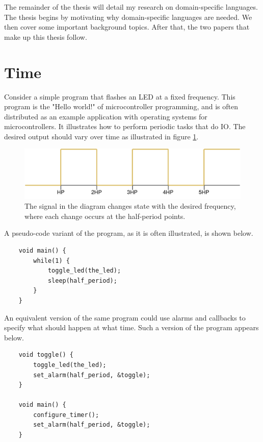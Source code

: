 
The remainder of the thesis will detail my research on domain-specific languages. The thesis begins by motivating
why domain-specific languages are needed. We then cover some important background topics. After that, the
two papers that make up this thesis follow.

\section{Time}

Consider a simple program
that flashes an LED at a fixed frequency. This program is the "Hello world!" of microcontroller programming, and is often distributed
as an example application with operating systems for microcontrollers. It illustrates how to perform
periodic tasks that do IO. The desired output should vary over time as illustrated in figure \ref{graphics:correct-frequency}.

\begin{figure}
    \centering
    \includegraphics[scale=0.2]{graphics/correct-frequency.png}
    \caption{The signal in the diagram changes state with the desired frequency, where each change occurs at the half-period points.}
    \label{graphics:correct-frequency}
\end{figure}

A pseudo-code variant of the program, as it is often illustrated, is shown below.

\begin{verbatim}
    void main() {
        while(1) {
            toggle_led(the_led);
            sleep(half_period);
        }
    }
\end{verbatim}

An equivalent version of the same program could use alarms and callbacks to specify what should happen at what time. Such
a version of the program appears below.
\begin{verbatim}
    void toggle() {
        toggle_led(the_led);
        set_alarm(half_period, &toggle);
    }

    void main() {
        configure_timer();
        set_alarm(half_period, &toggle);
    }
\end{verbatim}

